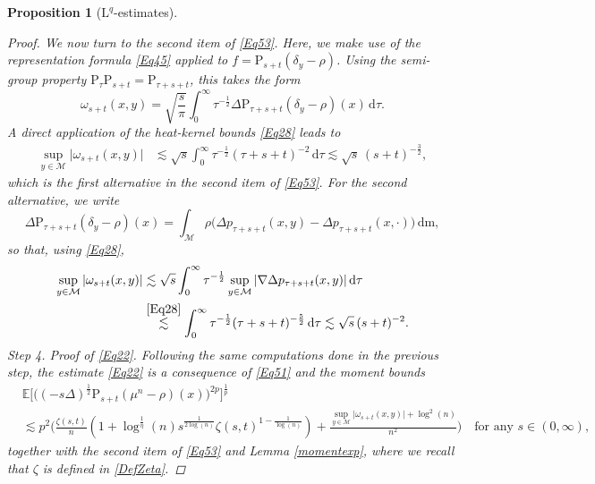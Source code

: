 \documentclass[11pt,a4paper,oneside]{amsart}
\numberwithin{equation}{section}
\newtheorem{proposition}[theorem]{Proposition}
\newcommand{\dd}{\mathrm{d}}
\newcommand{\LL}{\mathrm{L}}
\newcommand{\pp}{\mathrm{P}}
\newcommand{\m}{\mathrm{m}}
\begin{document}
\begin{proposition}[$\LL^{q}$-estimates]
\begin{proof}
We now turn to the second item of \eqref{Eq53}. Here, we make use of the representation formula \eqref{Eq45} applied to $f=\pp_{s+t}(\delta_y-\rho)$. Using the semi-group property $\text{P}_{\tau}\text{P}_{s+t}=\text{P}_{\tau+s+t}$, this takes the form
%
$$\omega_{s+t}(x,y)=\sqrt{\frac{s}{\pi}}\int_{0}^{\infty}\tau^{-\frac{1}{2}}\Delta\text{P}_{\tau+s+t}(\delta_y-\rho)(x)\,\dd\tau.$$
%
A direct application of the heat-kernel bounds \eqref{Eq28} leads to
%
\begin{align*}
\sup_{y\in\mathcal{M}}\vert\omega_{s+t}(x,y)\vert&\lesssim\sqrt{s}\int_{0}^{\infty}\tau^{-\frac{1}{2}}(\tau+s+t)^{-2}\,\dd\tau\lesssim \sqrt{s}\,(s+t)^{-\frac{3}{2}},
\end{align*}
%
which is the first alternative in the second item of \eqref{Eq53}. For the second alternative, we write 
%
$$\Delta \text{P}_{\tau+s+t}(\delta_y-\rho)(x)=\int_{\mathcal{M}}\rho\big(\Delta p_{\tau+s+t}(x,y)-\Delta p_{\tau+s+t}(x,\cdot)\big)\,\dd\m,$$
%
so that, using \eqref{Eq28},
%
\begin{align*}
%
\sup_{y\in\mathcal{M}}\vert\omega_{s+t}(x,y)\vert&\lesssim \sqrt{s}\int_{0}^{\infty}\tau^{-\frac{1}{2}}\sup_{y\in\mathcal{M}}\vert\nabla \Delta p_{\tau+s+t}(x,y)\vert\,\dd\tau\\
&\stackrel{\eqref{Eq28}}{\lesssim}\int_{0}^{\infty}\tau^{-\frac{1}{2}}(\tau+s+t)^{-\frac{5}{2}}\,\dd\tau\lesssim \sqrt{s}\,(s+t)^{-2}.
%
\end{align*}
%
{\sc Step 4. Proof of \eqref{Eq22}. }Following the same computations done in the previous step, the estimate \eqref{Eq22} is a consequence of \eqref{Eq51} and the moment bounds
%
\begin{equation}\label{Eq54}
%
\begin{aligned}
&\mathbb{E}\Big[\Big((-s\Delta)^{\frac{1}{2}}\text{P}_{s+t}(\mu^n-\rho)(x)\Big)^{2p}\Big]^{\frac{1}{p}}\\
&\lesssim p^2\bigg(\frac{\zeta(s,t)}{n}(1+\log^{\frac{1}{\eta}}(n)s^{\frac{1}{2\log(n)}}\zeta(s,t)^{1-\frac{1}{\log(n)}})+\frac{\sup_{y\in\mathcal{M}}\vert \omega_{s+t}(x,y)\vert+\log^2(n)}{n^2}\bigg) \quad\text{for any  $s\in (0,\infty)$,}
\end{aligned}
%
\end{equation}
%
together with the second item of \eqref{Eq53} and Lemma \ref{momentexp}, where we recall that $\zeta$ is defined in \eqref{DefZeta}.

%
\medskip
%


\end{proof}
\end{proposition}
\end{document}
